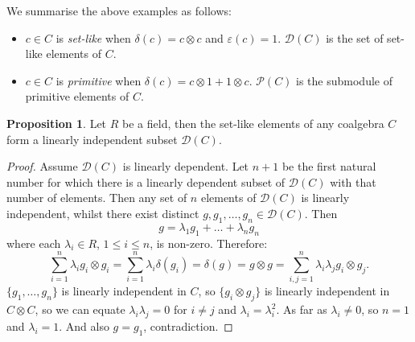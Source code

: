 \documentclass[8pt]{article}
\theoremstyle{definition}
\theoremstyle{definition}
\theoremstyle{definition}
\theoremstyle{definition}
\theoremstyle{definition}
\theoremstyle{definition}
\theoremstyle{definition}
\newtheorem{prop}{Proposition}[section]
\theoremstyle{definition}
\theoremstyle{definition}
\theoremstyle{definition}
\theoremstyle{definition}
\theoremstyle{definition}
\theoremstyle{definition}
\theoremstyle{definition}
\theoremstyle{question}
\begin{document}
We summarise the above examples as follows:
\begin{itemize}
  \item $c \in C$ is \emph{set-like} when $\delta(c) = c \otimes c$ and $\varepsilon(c) = 1$.
  $\mathcal{D}(C)$ is the set of set-like elements of $C$.
  \item $c \in C$ is \emph{primitive} when $\delta(c) = c \otimes 1 + 1 \otimes c$. $\mathcal{P}(C)$
  is the submodule of primitive elements of $C$.
\end{itemize}

\begin{prop}
  Let $R$ be a field, then the set-like elements of any coalgebra $C$ form a linearly independent
  subset $\mathcal{D}(C)$.
\end{prop}

\begin{proof}
  Assume $\mathcal{D}(C)$ is linearly dependent. Let $n + 1$ be the first natural number for which
  there is a linearly dependent subset of $\mathcal{D}(C)$ with that number of elements. Then
  any set of $n$ elements of $\mathcal{D}(C)$ is linearly independent, whilst there exist distinct
  $g, g_1, \ldots, g_n \in \mathcal{D}(C)$. Then
  \[
  g = \lambda_1 g_1 + \ldots + \lambda_n g_n
  \]
  where each $\lambda_i \in R$, $1 \leq i \leq n$, is non-zero. Therefore:
  \[
  \sum \limits_{i = 1}^n \lambda_i g_i \otimes g_i = \sum \limits_{i = 1}^n \lambda_i \delta(g_i) = \delta(g) = g \otimes g = \sum \limits_{i,j=1}^n \lambda_i \lambda_j g_i \otimes g_j.
  \]
  $\{ g_1, \ldots, g_n \}$ is linearly independent in $C$, so $\{ g_i \otimes g_j \}$ is linearly independent
  in $C \otimes C$, so we can equate $\lambda_i \lambda_j = 0$ for $i \neq j$ and $\lambda_i = \lambda^2_i$.
  As far as $\lambda_i \neq 0$, so $n = 1$ and $\lambda_i = 1$. And also $g = g_1$, contradiction.
\end{proof}
\end{document}

